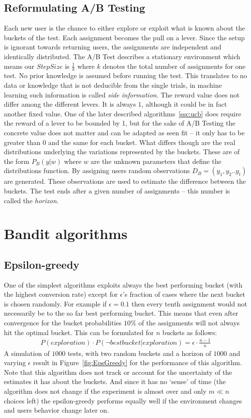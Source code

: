\documentclass[main.tex]{subfiles}
\begin{document}
\subsection{Reformulating A/B Testing}
Each new user is the chance to either explore or exploit what is known about the buckets of the test. Each assignment becomes the pull on a lever. Since the setup is ignorant towards returning users, the assignments are independent and identically distributed. The A/B Test describes a stationary environment which means our $StepSize$ is $\frac{1}{k}$ where $k$ denotes the total number of assignments for one test. No prior knowledge is assumed before running the test. This translates to no data or knowledge that is not deducible from the single trials, in machine learning such information is called \emph{side information}. The reward value does not differ among the different levers. It is always $1$, although it could be in fact another fixed value. One of the later described algorithms~\ref{ssc:ucb} does require the reward of a lever to be bounded by 1, but for the sake of A/B Testing the concrete value does not matter and can be adapted as seen fit -- it only has to be greater than $0$ and the same for each bucket. What differs though are the real distributions underlying the variations represented by the buckets. These are of the form $P_B(y|w)$ where $w$ are the unknown parameters that define the distributions function. By assigning users random observations $D_B=(y_1,y_2..y_t)$ are generated. These observations are used to estimate the difference between the buckets. The test ends after a given number of assignments -- this number is called the \emph{horizon}.

\section{Bandit algorithms}
\subsection{Epsilon-greedy}
One of the simplest algorithms exploits always the best performing bucket (with the highest conversion rate) except for $\epsilon $'s fraction of cases where the next bucket is chosen randomly. For example if $\epsilon = 0.1$ then every tenth assignment would not necessarily be to the so far best performing bucket. This means that even after convergence for the bucket probabilities $10\%$ of the assignments will not always hit the optimal bucket. This can be formulated for $n$ buckets as follows:
\begin{align*}
P(exploration) \cdot P(\neg best bucket | exploration) = \epsilon \cdot \frac{n-1}{n}
\end{align*}
A simulation of $1000$ tests, with two random buckets and a horizon of $1000$ and varying $\epsilon$ result in Figure~\ref{fig:EpsGreedy} for the performance of this algorithm. Note that this algorithm does not track or account for the uncertainty of the estimates it has about the buckets. And since it has no `sense' of time (the algorithm does not change if the experiment is almost over and only $m \ll n$ choices left) the epsilon-greedy performs equally well if the environment changes and users behavior change later on.
\end{document}
